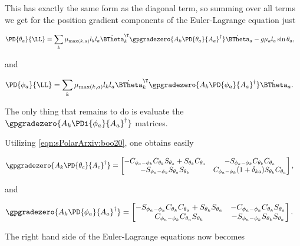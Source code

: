This has exactly the same form as the diagonal term, so summing over all terms we get for the position gradient components of the Euler-Lagrange equation just

\begin{align}\label{eqn:sPolarArxiv:boo41}
\PD{\theta_a}{\LL}
&=
\sum_{k}
\mu_{\max(k,a)} l_k l_a 
{\dot{\BTheta}_k}^\T
\gpgradezero{
A_k \PD{\theta_a}{A_a}^\dagger
} 
\dot{\BTheta}_a 
-g \mu_a l_a \sin\theta_a,
\end{align}

and

\begin{align}\label{eqn:sPolarArxiv:boo40}
\PD{\phi_a}{\LL}
&=
\sum_{k}
\mu_{\max(k,a)} l_k l_a 
{\dot{\BTheta}_k}^\T
\gpgradezero{
A_k \PD{\phi_a}{A_a}^\dagger
} 
\dot{\BTheta}_a.
\end{align}

The only thing that remains to do is evaluate the $\gpgradezero{A_k \PDi{\phi_a}{A_a}^\dagger}$ matrices.

Utilizing \ref{eqn:sPolarArxiv:boo20}, one obtains easily

\begin{align}\label{eqn:sPolarArxiv:boo51}
\gpgradezero{ A_k \PD{\theta_c}{A_c}^\dagger }
&=
\begin{bmatrix}
-C_{\phi_a - \phi_k} C_{\theta_k} S_{\theta_a} + S_{\theta_k} C_{\theta_a} &
-S_{\phi_a - \phi_k} C_{\theta_k} C_{\theta_a} \\
-S_{\phi_a - \phi_k} S_{\theta_a} S_{\theta_k} &
C_{\phi_a - \phi_k} (1 + \delta_{k a}) S_{\theta_k} C_{\theta_a} 
\end{bmatrix},
\end{align}

and

\begin{align}\label{eqn:sPolarArxiv:boo50}
\gpgradezero{ A_k \PD{\phi_a}{A_a}^\dagger }
&=
\begin{bmatrix}
-S_{\phi_a - \phi_k} C_{\theta_k} C_{\theta_a} + S_{\theta_k} S_{\theta_a} &
-C_{\phi_a - \phi_k} C_{\theta_k} S_{\theta_a} \\
C_{\phi_a - \phi_k} C_{\theta_a} S_{\theta_k} &
-S_{\phi_a - \phi_k} S_{\theta_k} S_{\theta_a} 
\end{bmatrix}.
\end{align}

The right hand side of the Euler-Lagrange equations now becomes

